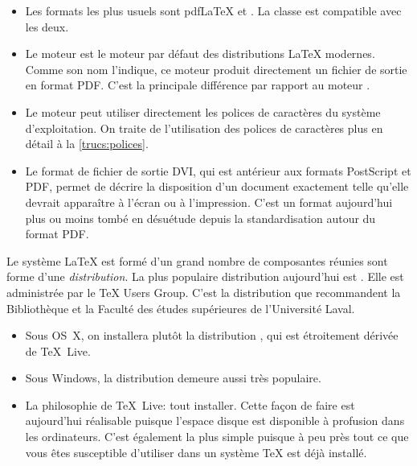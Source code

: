 \begin{itemize}
\item Les formats les plus usuels sont pdf{\LaTeX} et {\XeLaTeX}. La
  classe  est compatible avec les deux.
\item Le moteur  est le moteur par défaut des
  distributions {\LaTeX} modernes. Comme son nom l'indique, ce moteur
  produit directement un fichier de sortie en format PDF. C'est la
  principale différence par rapport au moteur .
\item Le moteur  peut utiliser directement les polices de
  caractères du système d'exploitation. On traite de l'utilisation des
  polices de caractères plus en détail à la \autoref{trucs:polices}.
\item Le format de fichier de sortie DVI, qui est antérieur aux
  formats PostScript et PDF, permet de décrire la disposition d'un
  document exactement telle qu'elle devrait apparaître à l'écran ou à
  l'impression. C'est un format aujourd'hui plus ou moins tombé en
  désuétude depuis la standardisation autour du format PDF.
\end{itemize}

Le système {\LaTeX} est formé d'un grand nombre de composantes réunies
sont forme d'une \emph{distribution}. La plus populaire distribution
aujourd'hui est %
. %
Elle est administrée par le {\TeX} Users Group. C'est la distribution que
recommandent la Bibliothèque et la Faculté des études supérieures de
l'Université Laval.

\begin{itemize}
\item Sous OS~X, on installera plutôt la distribution %
  , %
  qui est étroitement dérivée de {\TeX}~Live.
\item Sous Windows, la distribution %
  demeure aussi très populaire.
\item La philosophie de {\TeX}~Live: tout installer. Cette façon de
  faire est aujourd'hui réalisable puisque l'espace disque est
  disponible à profusion dans les ordinateurs. C'est également la plus
  simple puisque à peu près tout ce que vous êtes susceptible
  d'utiliser dans un système {\TeX} est déjà installé.
\end{itemize}


